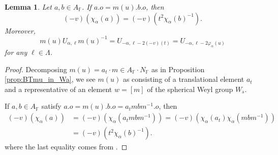 \documentclass[12pt]{amsart}
\newcommand{\F}{\mathbb{F} }
\numberwithin{equation}{section}
\newtheorem{lemma}[theorem]{Lemma}
\theoremstyle{remark} %
\begin{document}
	\begin{lemma}\label{lem:BTmUm}
		Let
			$a,b \in A_\F$. If $a.o = m(u).b.o$, then $$(-v)(\chi_{\alpha}(a)) = (-v)( t^2 \chi_{\alpha}(b)^{-1} ).$$
			Moreover,
			$$
			m(u)U_{\alpha,\ell}m(u)^{-1} = U_{-\alpha, \ell-2(-v)(t)} = U_{-\alpha, \ell-2\varphi_\alpha(u)}
			$$
			for any $\ell \in \Lambda$.
		\end{lemma}
		\begin{proof}
			Decomposing $m(u) =a_t \cdot m \in A_\F \cdot N_\F$ as in Proposition \ref{prop:BTmu_in_Wa}, we see $m(u)$ as consisting of a translational element $a_t$ and a representative of an element $w=[m]$ of the spherical Weyl group $W_s$. 
			
			If $a,b\in A_\F$ satisfy $a.o = m(u).b.o = a_t m b m^{-1}.o$, then
			\begin{align*}
				(-v)(\chi_\alpha(a)) &= (-v)(\chi_\alpha(a_t mbm^{-1})) 
				= (-v)(\chi_\alpha(a_t) \chi_\alpha(mbm^{-1})) \\
				&= (-v)(t^{2} \chi_\alpha(b)^{-1}).
			\end{align*}
			where the last equality comes from \cite[Lemma \ref{I-lem:Jacobson_Morozov_oneparam} and \ref{I-lem:Jacobson_Morozov_m}]{AppAGRCF}.
			

\end{proof}
\end{document}
